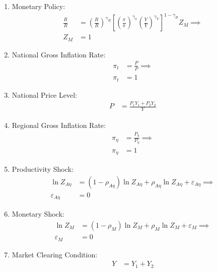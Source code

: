 \documentclass[../thesis.tex]{subfiles}
\begin{document}
\begin{enumerate}
	\item Monetary Policy:
	\begin{align}
		\frac{R_{}}{R} &= \left( \frac{R_{}}{R} \right)^{\gamma_{R}} \left[ \left( \frac{\pi_{}}{\pi_{}} \right)^{\gamma_{\pi}} \left( \frac{Y_{}}{Y_{}} \right)^{\gamma_{Y}} \right]^{1-\gamma_{R}} Z_{M} \implies \nonumber \\
		Z_{M} &= 1\label{eq_v5:reg-ss-monetary-policy}
	\end{align}
	
	\item National Gross Inflation Rate:
	\begin{align}
		\pi_t &= \frac{P_{}}{P_{}} \implies \nonumber \\
		\pi_t &= 1 \label{eq_v5:reg-ss-gross-inflation-rate}
	\end{align}
	
	\item National Price Level:
	\begin{align}
		P_{} &= \frac{P_{1} Y_{1} + P_{2} Y_{2}}{Y_{}} \label{eq_v5:reg-ss-national-price-level}
	\end{align}
	
	\item Regional Gross Inflation Rate:
	\begin{align}
		\pi_{\eta} &= \frac{P_{\eta}}{P_{\eta}} \implies \nonumber \\
		\pi_{\eta} &= 1 \label{eq_v5:reg-ss-regional-inflation}
	\end{align}
	
	\item Productivity Shock:
	\begin{align}
		\ln{Z_{A\eta}} &= (1-\rho_{A\eta})\ln{Z_{A\eta}} + \rho_{A\eta}\ln{Z_{A\eta}} + \varepsilon_{A\eta} \implies \nonumber \\
		\varepsilon_{A\eta} &= 0 \label{eq_v5:reg-ss-productivity-shock}
	\end{align}
	
	\item Monetary Shock:
	\begin{align}
		\ln{Z_{M}} &= (1-\rho_M)\ln{Z_{M}} + \rho_M\ln{Z_{M}} + \varepsilon_{M} \implies \nonumber \\
		\varepsilon_{M} &= 0 \label{eq_v5:reg-ss-monetary-shock}
	\end{align}
	
	\item Market Clearing Condition:
	\begin{align}
		Y_{} &= Y_{1} + Y_{2} \label{eq_v5:reg-ss-market-clearing-condition-Y}
	\end{align}
	

\end{enumerate}
\end{document}
